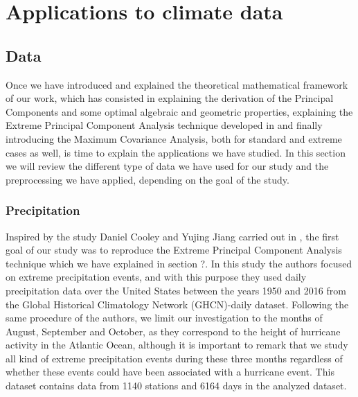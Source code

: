 \documentclass[11pt, oneside]{book}
\theoremstyle{plain}
\theoremstyle{remark}
\begin{document}
\chapter{Applications to climate data}
\section{Data}
Once we have introduced and explained the theoretical mathematical framework of
our work, which has consisted in explaining the derivation of the Principal
Components and some optimal algebraic and geometric properties, explaining the
Extreme Principal Component Analysis technique developed in
\cite{cooley-thibaud} and finally introducing the Maximum Covariance Analysis,
both for standard and extreme cases as well, is time to explain the applications
we have studied. In this section we will review the different type of data we
have used for our study and the preprocessing we have applied, depending on the
goal of the study. 
\subsection{Precipitation}
Inspired by the study Daniel Cooley and Yujing Jiang carried out in
\cite{jiang-cooley}, the first goal of our study was to reproduce the Extreme
Principal Component Analysis technique which we have explained in section ?.
In this study the authors focused on extreme precipitation events, and with
this purpose they used daily precipitation data over the United States between
the years 1950 and 2016 from the Global Historical Climatology Network
(GHCN)-daily dataset. Following the same procedure of the authors, we limit our 
investigation to the months of August, September and October, as they correspond
to the height of hurricane activity in the Atlantic Ocean, although it is
important to remark that we study all kind of extreme precipitation events
during these three months regardless of whether these events could have been
associated with a hurricane event. This dataset contains data from 1140 stations
and 6164 days in the analyzed dataset.
\end{document}
